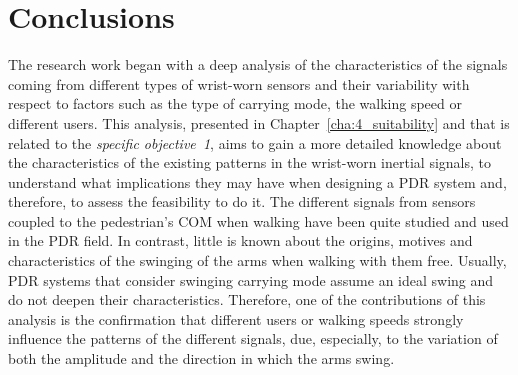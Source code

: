 \section{Conclusions}
\label{sec:10_1_specObj}
The research work began with a deep analysis of the characteristics of the signals coming from different types of wrist-worn sensors and their variability with respect to factors such as the type of carrying mode, the walking speed or different users.
This analysis, presented in Chapter~\ref{cha:4_suitability} and that is related to the \emph{specific objective~1}, aims to gain a more detailed knowledge about the characteristics of the existing patterns in the wrist-worn inertial signals, to understand what implications they may have when designing a PDR system and, therefore, to assess the feasibility to do it.
The different signals from sensors coupled to the pedestrian's COM when walking have been quite studied and used in the PDR field.
In contrast, little is known about the origins, motives and characteristics of the swinging of the arms when walking with them free.
Usually, PDR systems that consider swinging carrying mode assume an ideal swing and do not deepen their characteristics.
Therefore, one of the contributions of this analysis is the confirmation that different users or walking speeds strongly influence the patterns of the different signals, due, especially, to the variation of both the amplitude and the direction in which the arms swing. 
